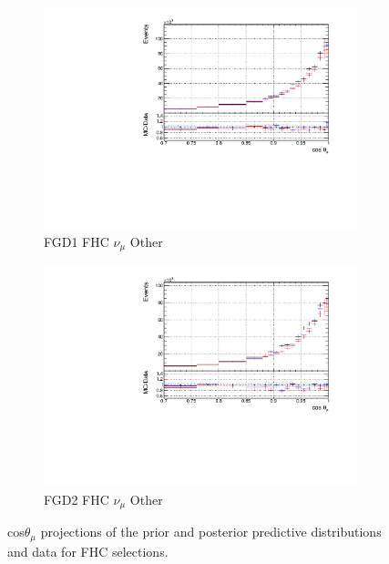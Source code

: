 \begin{figure}[!h]
\begin{subfigure}{0.49\textwidth}
  \centering
  \includegraphics[width=\textwidth]{figs/priorpred1D_t_FGD1_numuCC_other}
  \caption{FGD1 FHC $\nu_{\mu}$ Other}
\end{subfigure}
\begin{subfigure}{0.49\textwidth}
  \centering
  \includegraphics[width=\textwidth]{figs/priorpred1D_t_FGD2_numuCC_other}
  \caption{FGD2 FHC $\nu_{\mu}$ Other}
\end{subfigure}
\caption{cos$\theta_{\mu}$ projections of the prior and posterior predictive distributions and data for FHC \numu selections.}
\label{fig:priorpost_fhc_t}
\end{figure}

